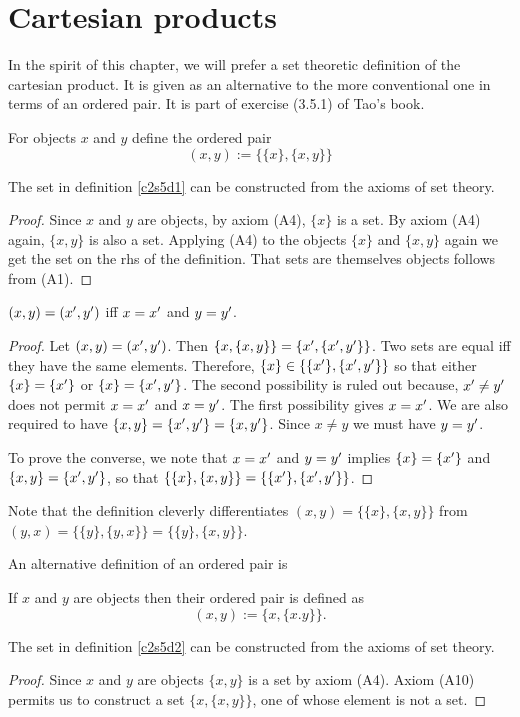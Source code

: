 \section{Cartesian products}\label{c2s5}
In the spirit of this chapter, we will prefer a set theoretic definition
of the cartesian product. It is given as an alternative to the more
conventional one in terms of an ordered pair. It is part of exercise
(3.5.1) of Tao's \cite{tao2014a1} book.
\begin{defn}\label{c2s5d1}
For objects $x$ and $y$ define the ordered pair 
\[
(x, y) := \{\{x\}, \{x,y\}\}
\]
\end{defn}

\begin{lem}\label{c2s5l1}
The set in definition \ref{c2s5d1} can be constructed from the axioms of
set theory.
\end{lem}
\begin{proof}
Since $x$ and $y$ are objects, by axiom (A4), $\{x\}$ is a set. By axiom
(A4) again, $\{x, y\}$ is also a set. Applying (A4) to the objects $\{x\}$
and $\{x, y\}$ again we get the set on the rhs of the definition. That
sets are themselves objects follows from (A1).
\end{proof}

\begin{lem}\label{c2s5l2}
$(x, y) = (x^\prime, y^\prime)$ iff $x = x^\prime$ and $y = y^\prime$.
\end{lem}
\begin{proof}
Let $(x, y) = (x^\prime, y^\prime)$. Then $\{{x}, \{x, y\}\} = \{{x^\prime}, 
\{x^\prime , y^\prime \}\}$. Two sets are equal iff they have the same elements.
Therefore, $\{x\} \in \{\{x^\prime\}, \{x^\prime, y^\prime\}\}$ so that either
$\{x\} = \{x^\prime\}$ or $\{x\} = \{x^\prime, y^\prime\}$. The second possibility
is ruled out because, $x^\prime \ne y^\prime$ does not permit $x = x^\prime$ and
$x = y^\prime$. The first possibility gives $x = x^\prime$. We are also required
to have $\{x, y\} = \{x^\prime, y^\prime\} = \{x, y^\prime\}$. Since $x \ne y$
we must have $y = y^\prime$.

To prove the converse, we note that $x = x^\prime$ and $y = y^\prime$ implies 
$\{x\} = \{x^\prime\}$ and $\{x, y\} = \{x^\prime, y^\prime\}$, so that 
$\{\{x\}, \{x, y\}\} = \{\{x^\prime\}, \{x^\prime, y^\prime\}\}$.
\end{proof}

Note that the definition cleverly differentiates $(x, y) = \{\{x\}, \{x,
y\}\}$ from $(y, x) = \{\{y\}, \{y, x\}\} = \{\{y\}, \{x, y\}\}$.

An alternative definition of an ordered pair is
\begin{defn}\label{c2s5d2}
If $x$ and $y$ are objects then their ordered pair is defined as
\[
(x, y) := \{x, \{x. y\}\}.
\]
\end{defn}
\begin{lem}\label{c2s5l3}
The set in definition \ref{c2s5d2} can be constructed from the axioms of
set theory.
\end{lem}
\begin{proof}
Since $x$ and $y$ are objects $\{x, y\}$ is a set by axiom (A4). Axiom
(A10) permits us to construct a set $\{x, \{x, y\}\}$, one of whose 
element is not a set.
\end{proof}

